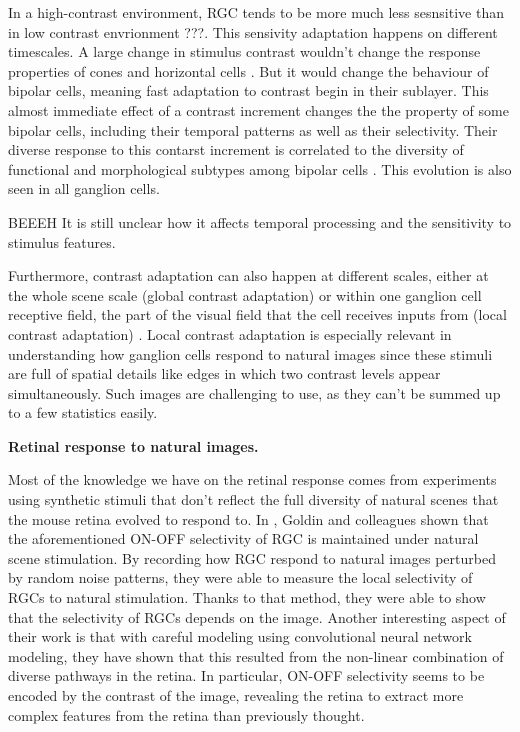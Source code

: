 In a high-contrast environment, RGC tends to be more much less sesnsitive than
in low contrast envrionment \cite{} ???.
This sensivity adaptation happens on different timescales.
A large change in stimulus contrast wouldn't change the response properties of
cones and horizontal cells \cite{}. But it would change the behaviour of
bipolar cells, meaning fast adaptation to contrast begin in their sublayer.
This almost immediate effect of a contrast increment changes the the property
of some bipolar cells, including their temporal patterns as well as their
selectivity. Their diverse response to this contarst increment
is correlated to the diversity of functional and morphological subtypes among
bipolar cells \cite{baccus_fast_2002}.
This evolution is also seen in all ganglion cells.


BEEEH It is still unclear how it
affects temporal processing and the sensitivity to stimulus
features\citep{baccus_fast_2002}.

Furthermore, contrast adaptation can also
happen at different scales, either at the whole scene scale (global contrast
adaptation) or within one ganglion cell receptive field, the part of the visual
field that the cell receives inputs from (local contrast adaptation)
\citep{garvert_local_2013}. Local contrast adaptation is especially relevant in
understanding how ganglion cells respond to natural images since these stimuli
are full of spatial details like edges in which two contrast levels appear
simultaneously. Such images are challenging to use, as they can't be summed up
to a few statistics easily.

\textbf{Retinal response to natural images.}

Most of the knowledge we have on the retinal response comes from experiments
using synthetic stimuli that don't reflect the full diversity of natural
scenes that the mouse retina evolved to respond to. In
\cite{goldin_context-dependent_2022}, Goldin and colleagues shown that the
aforementioned ON-OFF selectivity of RGC is maintained under natural scene
stimulation. By recording how RGC respond to natural images perturbed by
random noise patterns, they were able to measure the local selectivity of RGCs
to natural stimulation.
Thanks to that method, they were able to show that the selectivity of RGCs
depends on the image. Another interesting aspect of their work is that with
careful modeling using convolutional neural network modeling, they have shown
that this resulted from the non-linear combination of diverse pathways in the
retina. In particular, ON-OFF selectivity seems to be encoded by the contrast
of the image, revealing the retina to extract more complex features from the
retina than previously thought.

